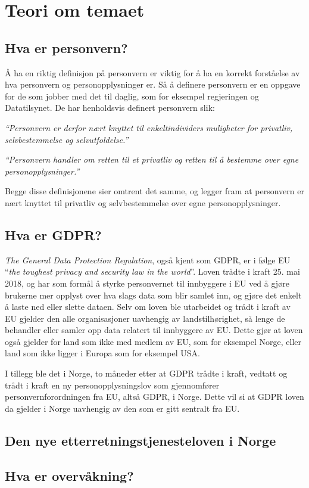 \section{Teori om temaet}

\subsection{Hva er personvern?}
Å ha en riktig definisjon på personvern er viktig for å ha en korrekt forståelse av hva personvern og personopplysninger er. Så å definere personvern er en oppgave for de som jobber med det til daglig, som for eksempel regjeringen og Datatilsynet. De har henholdsvis definert personvern slik:

\textit{``Personvern er derfor nært knyttet til enkeltindividers muligheter for privatliv, selvbestemmelse og selvutfoldelse.''} \parencite{artikkel:regjeringen_personvern}

\textit{``Personvern handler om retten til et privatliv og retten til å bestemme over egne personopplysninger.''} \parencite{artikkel:datatilsynet_personvern}

Begge disse definisjonene sier omtrent det samme, og legger fram at personvern er nært knyttet til privatliv og selvbestemmelse over egne personopplysninger.

\subsection{Hva er GDPR?}
\textit{The General Data Protection Regulation}, også kjent som GDPR, er i følge EU ``\emph{the toughest privacy and security law in the world}''. Loven trådte i kraft 25. mai 2018, og har som formål å styrke personvernet til innbyggere i EU ved å gjøre brukerne mer opplyst over hva slags data som blir samlet inn, og gjøre det enkelt å laste ned eller slette dataen. Selv om loven ble utarbeidet og trådt i kraft av EU gjelder den alle organisasjoner uavhengig av landstilhørighet, så lenge de behandler eller samler opp data relatert til innbyggere av EU. Dette gjør at loven også gjelder for land som ikke med medlem av EU, som for eksempel Norge, eller land som ikke ligger i Europa som for eksempel USA. \parencite{artikkel:eu_gdpr}

I tillegg ble det i Norge, to måneder etter at GDPR trådte i kraft, vedtatt og trådt i kraft en ny personopplysningslov som gjennomfører personvernforordningen fra EU, altså GDPR, i Norge. Dette vil si at GDPR loven da gjelder i Norge uavhengig av den som er gitt sentralt fra EU. \parencite{artikkel:regjeringen_gdpr}

\subsection{Den nye etterretningstjenesteloven i Norge}

\parencite{artikkel:regjeringen_nylov}

\subsection{Hva er overvåkning?}

\newpage